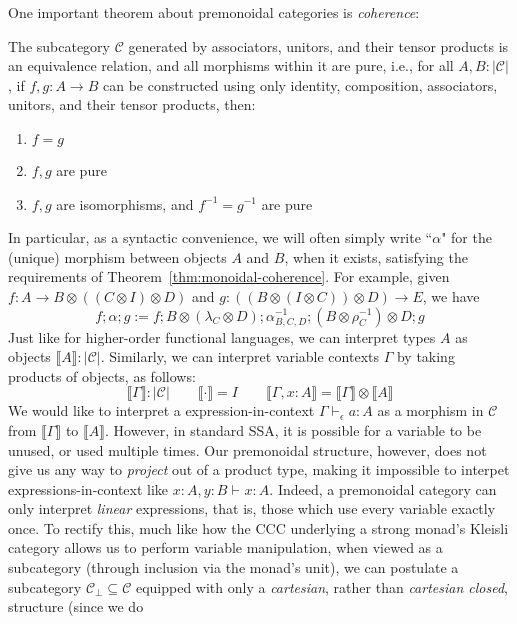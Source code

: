 \documentclass[acmsmall,screen,review]{acmart}
\newcommand{\mc}[1]{\ensuremath{\mathcal{#1}}}
\newcommand{\bhyp}[2]{#1 : #2}
\newcommand{\hasty}[4]{#1 \vdash_{#2} #3: {#4}}
\newcommand{\dnt}[1]{\llbracket{#1}\rrbracket}
\begin{document}
One important theorem about premonoidal categories is \emph{coherence}:
\begin{theorem}
  The subcategory $\mc{C}$ generated by associators, unitors, and their tensor products is an
  equivalence relation, and all morphisms within it are pure, i.e., for all $A, B : |\mc{C}|$, if
  $f, g : A \to B$ can be constructed using only identity, composition, associators, unitors, and
  their tensor products, then:
  \begin{enumerate}[label=(\alph*)]
    \item $f = g$
    \item $f, g$ are pure
    \item $f, g$ are isomorphisms, and $f^{-1} = g^{-1}$ are pure
  \end{enumerate}
  \label{thm:monoidal-coherence}
\end{theorem}
In particular, as a syntactic convenience, we will often simply write ``$\alpha$" for the (unique)
morphism between objects $A$ and $B$, when it exists, satisfying the requirements of
Theorem~\ref{thm:monoidal-coherence}. For example, given $f : A \to B \otimes ((C \otimes I)
\otimes D)$ and $g : ((B \otimes (I \otimes C)) \otimes D) \to E$, we have
$$
f;\alpha;g := 
  f ; 
  B \otimes (\lambda_C \otimes D) ; 
  \alpha_{B, C, D}^{-1} ; 
  (B \otimes \rho_C^{-1}) \otimes D ;
  g 
$$
Just like for higher-order functional languages, we can interpret types $A$ as objects $\dnt{A} :
|\mc{C}|$. Similarly, we can interpret variable contexts $\Gamma$ by taking products of objects, as
follows:
$$
\boxed{\dnt{\Gamma} : |\mc{C}|} \qquad 
  \dnt{\cdot} = I \qquad \dnt{\Gamma, \bhyp{x}{A}} = \dnt{\Gamma} \otimes \dnt{A}
$$
We would like to interpret a expression-in-context $\hasty{\Gamma}{\epsilon}{a}{A}$ as a morphism in
$\mc{C}$ from $\dnt{\Gamma}$ to $\dnt{A}$. However, in standard SSA, it is possible for a variable
to be unused, or used multiple times. Our premonoidal structure, however, does not give us any way
to \emph{project} out of a product type, making it impossible to interpet expressions-in-context
like
$
\hasty{\bhyp{x}{A}, \bhyp{y}{B}}{}{x}{A}
$. 
Indeed, a premonoidal category can only interpret \emph{linear} expressions, that is, those which
use every variable exactly once. To rectify this, much like how the CCC underlying a strong monad's
Kleisli category allows us to perform variable manipulation, when viewed as a subcategory (through
inclusion via the monad's unit), we can postulate a subcategory $\mc{C}_\bot \subseteq \mc{C}$
equipped with only a \emph{cartesian}, rather than \emph{cartesian closed}, structure (since we do
\end{document}
